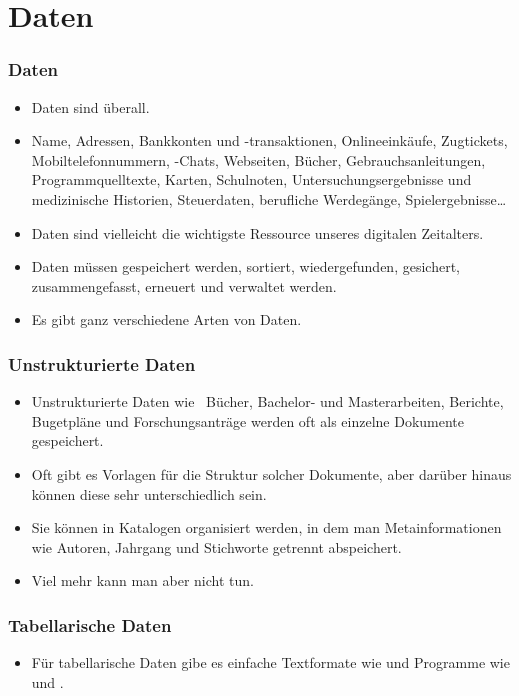 \documentclass[aspectratio=169,mathserif,notheorems]{beamer}%
\begin{document}
\section{Daten}%
%
\begin{frame}
\frametitle{Daten}%
\begin{itemize}%
\item Daten sind überall.%
\item<2-> Name, Adressen, Bankkonten und -transaktionen,  Onlineeinkäufe, Zugtickets, Mobiltelefonnummern, -Chats, Webseiten, Bücher, Gebrauchsanleitungen, Programmquelltexte, Karten, Schulnoten, Untersuchungsergebnisse und medizinische Historien, Steuerdaten, berufliche Werdegänge, Spielergebnisse{\dots}%
\item<4-> Daten sind vielleicht die wichtigste Ressource unseres digitalen Zeitalters.%
\item<5-> Daten müssen gespeichert werden, sortiert, wiedergefunden, gesichert, zusammengefasst, erneuert und verwaltet werden.%
\item<6-> Es gibt ganz verschiedene Arten von Daten.
\end{itemize}%
\end{frame}%
%
\begin{frame}[t]%
\frametitle{Unstrukturierte Daten}%
\begin{itemize}%
\item Unstrukturierte Daten wie \DEzB\ Bücher, Bachelor- und Masterarbeiten, Berichte, Bugetpläne und Forschungsanträge werden oft als einzelne Dokumente gespeichert.%
\item<3-> Oft gibt es Vorlagen für die Struktur solcher Dokumente, aber darüber hinaus können diese sehr unterschiedlich sein.%
\item<4-> Sie können in Katalogen organisiert werden, in dem man Metainformationen wie Autoren, Jahrgang und Stichworte getrennt abspeichert.%
\item<5-> Viel mehr kann man aber nicht tun.%
\end{itemize}%
%
%
\end{frame}%
%
%
\begin{frame}[t]%
\frametitle{Tabellarische Daten}%
\begin{itemize}%
\item Für tabellarische Daten gibe es einfache Textformate wie \cite{RFC4180} und Programme wie \microsoftExcel\cite{B2023DMWME,G2024ECRFMME} und \libreofficeCalc\cite{S2022L7PFEUU,DF2024LTDF}.%
\end{itemize}%
%
%
\end{frame}%
\end{document}

